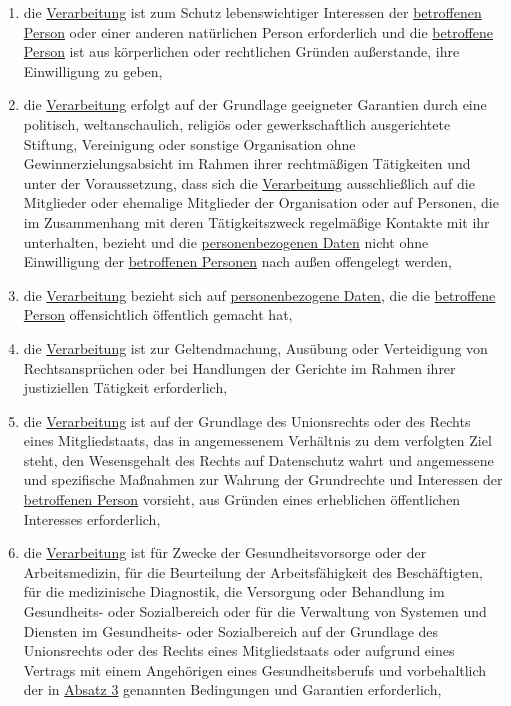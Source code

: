 \begin{enumerate}
\begin{enumerate}
    \item die \hyperref[itm:04-2]{Verarbeitung} ist zum Schutz lebenswichtiger Interessen der \hyperref[itm:04-1]{betroffenen Person} oder einer anderen
     natürlichen Person erforderlich und die \hyperref[itm:04-1]{betroffene Person} ist aus körperlichen oder rechtlichen Gründen
     außerstande, ihre Einwilligung zu geben,
    \label{itm:09-2c}

    \item die \hyperref[itm:04-2]{Verarbeitung} erfolgt auf der Grundlage geeigneter Garantien durch eine politisch, weltanschaulich,
     religiös oder gewerkschaftlich ausgerichtete Stiftung, Vereinigung oder sonstige Organisation ohne
     Gewinnerzielungsabsicht im Rahmen ihrer rechtmäßigen Tätigkeiten und unter der Voraussetzung, dass sich die
     \hyperref[itm:04-2]{Verarbeitung} ausschließlich auf die Mitglieder oder ehemalige Mitglieder der Organisation oder auf Personen, die
     im Zusammenhang mit deren Tätigkeitszweck regelmäßige Kontakte mit ihr unterhalten, bezieht und die
     \hyperref[itm:04-1]{personenbezogenen Daten} nicht ohne Einwilligung der \hyperref[itm:04-1]{betroffenen Personen} nach außen offengelegt werden,
    \label{itm:09-2d}

    \item die \hyperref[itm:04-2]{Verarbeitung} bezieht sich auf \hyperref[itm:04-1]{personenbezogene Daten}, die die \hyperref[itm:04-1]{betroffene Person} offensichtlich öffentlich
     gemacht hat,
    \label{itm:09-2e}

    \item die \hyperref[itm:04-2]{Verarbeitung} ist zur Geltendmachung, Ausübung oder Verteidigung von Rechtsansprüchen oder bei Handlungen
     der Gerichte im Rahmen ihrer justiziellen Tätigkeit erforderlich,
    \label{itm:09-2f}

    \item die \hyperref[itm:04-2]{Verarbeitung} ist auf der Grundlage des Unionsrechts oder des Rechts eines Mitgliedstaats, das in
     angemessenem Verhältnis zu dem verfolgten Ziel steht, den Wesensgehalt des Rechts auf Datenschutz wahrt und
     angemessene und spezifische Maßnahmen zur Wahrung der Grundrechte und Interessen der \hyperref[itm:04-1]{betroffenen Person} vorsieht,
     aus Gründen eines erheblichen öffentlichen Interesses erforderlich,
    \label{itm:09-2g}

    \item die \hyperref[itm:04-2]{Verarbeitung} ist für Zwecke der Gesundheitsvorsorge oder der Arbeitsmedizin, für die Beurteilung der
     Arbeitsfähigkeit des Beschäftigten, für die medizinische Diagnostik, die Versorgung oder Behandlung im
     Gesundheits- oder Sozialbereich oder für die Verwaltung von Systemen und Diensten im Gesundheits- oder
     Sozialbereich auf der Grundlage des Unionsrechts oder des Rechts eines Mitgliedstaats oder aufgrund eines Vertrags
     mit einem Angehörigen eines Gesundheitsberufs und vorbehaltlich der in \hyperref[itm:09-3]{Absatz 3} genannten
     Bedingungen und Garantien erforderlich,
    \label{itm:09-2h}


\end{enumerate}
\end{enumerate}
